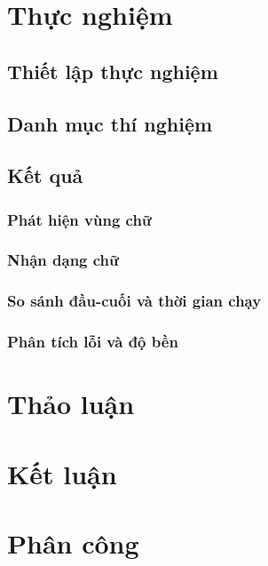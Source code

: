 \documentclass[11pt,a4paper]{article}
\begin{document}
\section{Thực nghiệm}\label{sec:exp}
\subsection{Thiết lập thực nghiệm}\label{sec:setup}



\subsection{Danh mục thí nghiệm}\label{sec:experiments}

\subsection{Kết quả}\label{sec:results}
\subsubsection{Phát hiện vùng chữ}\label{sec:e-detect}

\subsubsection{Nhận dạng chữ}\label{sec:e-recognize}

\subsubsection{So sánh đầu-cuối và thời gian chạy}\label{sec:e-endtoend}


\subsubsection{Phân tích lỗi và độ bền}\label{sec:e-ablation}



\section{Thảo luận}\label{sec:discussion}


\section{Kết luận}\label{sec:conclusion}


\section{Phân công}\label{sec:contrib}

\end{document}
